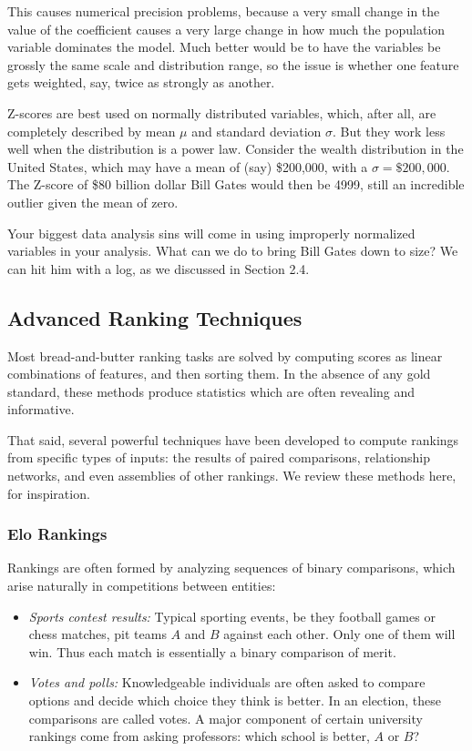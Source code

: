 \documentclass[10pt]{article}
\begin{document}
This causes numerical precision problems, because a very small change in the value of the coefficient causes a very large change in how much the population variable dominates the model. Much better would be to have the variables be grossly the same scale and distribution range, so the issue is whether one feature gets weighted, say, twice as strongly as another.

Z-scores are best used on normally distributed variables, which, after all, are completely described by mean $\mu$ and standard deviation $\sigma$. But they work less well when the distribution is a power law. Consider the wealth distribution in the United States, which may have a mean of (say) \$200,000, with a $\sigma=\$200,000$. The Z-score of \$80 billion dollar Bill Gates would then be 4999, still an incredible outlier given the mean of zero.

Your biggest data analysis sins will come in using improperly normalized variables in your analysis. What can we do to bring Bill Gates down to size? We can hit him with a log, as we discussed in Section 2.4.

\subsection{Advanced Ranking Techniques}
Most bread-and-butter ranking tasks are solved by computing scores as linear combinations of features, and then sorting them. In the absence of any gold standard, these methods produce statistics which are often revealing and informative.

That said, several powerful techniques have been developed to compute rankings from specific types of inputs: the results of paired comparisons, relationship networks, and even assemblies of other rankings. We review these methods here, for inspiration.

\subsubsection{Elo Rankings}
Rankings are often formed by analyzing sequences of binary comparisons, which arise naturally in competitions between entities:


\begin{itemize}
    \item \textit{Sports contest results:} Typical sporting events, be they football games or chess matches, pit teams $A$ and $B$ against each other. Only one of them will win. Thus each match is essentially a binary comparison of merit.
    \item \textit{Votes and polls:} Knowledgeable individuals are often asked to compare options and decide which choice they think is better. In an election, these comparisons are called votes. A major component of certain university rankings come from asking professors: which school is better, $A$ or $B$?
\end{itemize}
\end{document}
